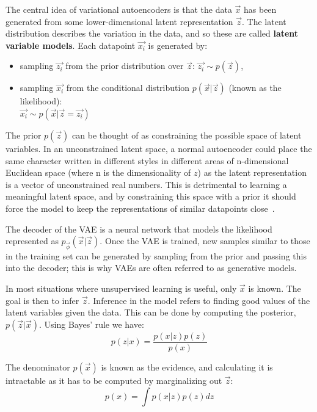 The central idea of variational autoencoders is that the data $\vec{x}$ has been generated from some lower-dimensional latent
representation $\vec{z}$. The latent distribution describes the variation in the data, and so these are called 
\textbf{latent variable models}. Each datapoint $\vec{x_{i}}$ is generated by:
\begin{itemize}
  \item sampling $\vec{z_{i}}$ from the prior distribution over $\vec{z}$: $\vec{z_{i}} \sim p(\vec{z})$, 
  \item sampling $\vec{x_{i}}$ from the conditional distribution $p(\vec{x}|\vec{z})$ (known as the likelihood): \\ 
  $\vec{x_{i}} \sim p(\vec{x}|\vec{z}=\vec{z_{i}})$
\end{itemize}

The prior $p(\vec{z})$ can be thought of as constraining the possible space of latent variables. In an unconstrained latent space, a
normal autoencoder could place the same character written in different styles in different areas of n-dimensional Euclidean space (where n is the 
dimensionality of $z$) as the latent representation is a vector of unconstrained real numbers. This is detrimental to learning a meaningful 
latent space, and by constraining this space with a prior it should force the model to keep the representations of similar datapoints close~\cite{Tutorial70:online}.

The decoder of the VAE is a neural network that models the likelihood represented as $p_{\vec{\phi}}(\vec{x}|\vec{z})$. Once the VAE is 
trained, new samples similar to 
those in the training set can be generated by sampling from the prior and passing this into the decoder; this is why VAEs are often
referred to as generative models.

In most situations where unsupervised learning is useful, only $\vec{x}$ is known. The goal is then to infer $\vec{z}$.
Inference in the model refers to finding good values of the latent variables given the data. This can be done by computing the
posterior, $p(\vec{z}|\vec{x})$. Using Bayes' rule we have:
\begin{equation}
  p(z|x) = \frac{p(x|z)p(z)}{p(x)}
\end{equation}

The denominator $p(\vec{x})$ is known as the evidence, and calculating it is intractable as it has to be computed by marginalizing out $\vec{z}$:
\begin{equation}
  p(x) = \int p(x|z)p(z) dz
\end{equation}

